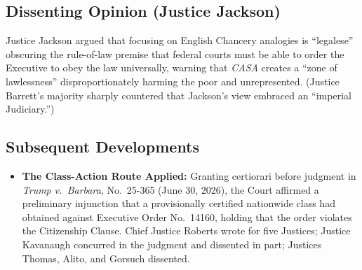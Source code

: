 \documentclass[12pt]{article}
\begin{document}
\subsection{Dissenting Opinion (Justice Jackson)}

Justice Jackson argued that focusing on English Chancery analogies is ``legalese'' obscuring the rule-of-law premise that federal courts must be able to order the Executive to obey the law universally, warning that \textit{CASA} creates a ``zone of lawlessness'' disproportionately harming the poor and unrepresented. (Justice Barrett's majority sharply countered that Jackson's view embraced an ``imperial Judiciary.'')

\subsection{Subsequent Developments}

\begin{itemize}

\item \textbf{The Class-Action Route Applied:} Granting certiorari before judgment in \textit{Trump v.\ Barbara}, No.~25-365 (June 30, 2026), the Court affirmed a preliminary injunction that a provisionally certified nationwide class had obtained against Executive Order No.~14160, holding that the order violates the Citizenship Clause. Chief Justice Roberts wrote for five Justices; Justice Kavanaugh concurred in the judgment and dissented in part; Justices Thomas, Alito, and Gorsuch dissented.

\end{itemize}
\end{document}
